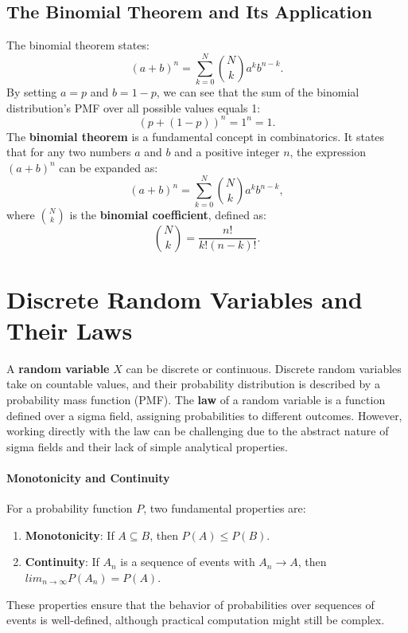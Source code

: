     \subsection{The Binomial Theorem and Its Application}
    The binomial theorem states:
    \[
    (a + b)^n = \sum_{k=0}^{N} \binom{N}{k} a^k b^{n-k}.
    \]
    By setting \( a = p \) and \( b = 1 - p \), we can see that the sum of the binomial distribution's PMF over all possible values equals 1:
    \[
    (p + (1-p))^n = 1^n = 1.
    \]
    The \textbf{binomial theorem} is a fundamental concept in combinatorics. It states that for any two numbers \( a \) and \( b \) and a positive integer \( n \), the expression \( (a + b)^n \) can be expanded as:
    \[
    (a + b)^n = \sum_{k=0}^{N} \binom{N}{k} a^k b^{n-k},
    \]
    where \( \binom{N}{k} \) is the \textbf{binomial coefficient}, defined as:
    \[
    \binom{N}{k} = \frac{n!}{k!(n-k)!}.
    \]
  
    \section{Discrete Random Variables and Their Laws}   
    A \textbf{random variable} \( X \) can be discrete or continuous. Discrete random variables take on countable values, and their probability distribution is described by a probability mass function (PMF). \newline
    The \textbf{law} of a random variable is a function defined over a sigma field, assigning probabilities to different outcomes. However, working directly with the law can be challenging due to the abstract nature of sigma fields and their lack of simple analytical properties.
    
    \paragraph{Monotonicity and Continuity}
    For a probability function \( P \), two fundamental properties are:
    \begin{enumerate}
        \item \textbf{Monotonicity}: If \( A \subseteq B \), then \( P(A) \leq P(B) \).
        \item \textbf{Continuity}: If \( A_n \) is a sequence of events with \( A_n \to A \), then $lim_{n \to \infty} P(A_n) = P(A)$.
    \end{enumerate}
    These properties ensure that the behavior of probabilities over sequences of events is well-defined, although practical computation might still be complex. 
    
